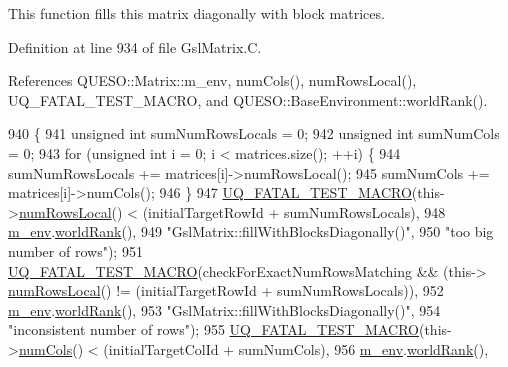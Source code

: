 This function fills {\ttfamily this} matrix diagonally with block matrices. 



Definition at line 934 of file Gsl\-Matrix.\-C.



References Q\-U\-E\-S\-O\-::\-Matrix\-::m\-\_\-env, num\-Cols(), num\-Rows\-Local(), U\-Q\-\_\-\-F\-A\-T\-A\-L\-\_\-\-T\-E\-S\-T\-\_\-\-M\-A\-C\-R\-O, and Q\-U\-E\-S\-O\-::\-Base\-Environment\-::world\-Rank().


\begin{DoxyCode}
940 \{
941   \textcolor{keywordtype}{unsigned} \textcolor{keywordtype}{int} sumNumRowsLocals = 0;
942   \textcolor{keywordtype}{unsigned} \textcolor{keywordtype}{int} sumNumCols       = 0;
943   \textcolor{keywordflow}{for} (\textcolor{keywordtype}{unsigned} \textcolor{keywordtype}{int} i = 0; i < matrices.size(); ++i) \{
944     sumNumRowsLocals += matrices[i]->numRowsLocal();
945     sumNumCols       += matrices[i]->numCols();
946   \}
947   \hyperlink{_defines_8h_a56d63d18d0a6d45757de47fcc06f574d}{UQ\_FATAL\_TEST\_MACRO}(this->\hyperlink{class_q_u_e_s_o_1_1_gsl_matrix_ab5ec937a9fd439eef1a87e12c0dbccb4}{numRowsLocal}() < (initialTargetRowId + 
      sumNumRowsLocals),
948                       \hyperlink{class_q_u_e_s_o_1_1_matrix_a247fb0fc0b87fecdee054bb4660b68e8}{m\_env}.\hyperlink{class_q_u_e_s_o_1_1_base_environment_a78b57112bbd0e6dd0e8afec00b40ffa7}{worldRank}(),
949                       \textcolor{stringliteral}{"GslMatrix::fillWithBlocksDiagonally()"},
950                       \textcolor{stringliteral}{"too big number of rows"});
951   \hyperlink{_defines_8h_a56d63d18d0a6d45757de47fcc06f574d}{UQ\_FATAL\_TEST\_MACRO}(checkForExactNumRowsMatching && (this->
      \hyperlink{class_q_u_e_s_o_1_1_gsl_matrix_ab5ec937a9fd439eef1a87e12c0dbccb4}{numRowsLocal}() != (initialTargetRowId + sumNumRowsLocals)),
952                       \hyperlink{class_q_u_e_s_o_1_1_matrix_a247fb0fc0b87fecdee054bb4660b68e8}{m\_env}.\hyperlink{class_q_u_e_s_o_1_1_base_environment_a78b57112bbd0e6dd0e8afec00b40ffa7}{worldRank}(),
953                       \textcolor{stringliteral}{"GslMatrix::fillWithBlocksDiagonally()"},
954                       \textcolor{stringliteral}{"inconsistent number of rows"});
955   \hyperlink{_defines_8h_a56d63d18d0a6d45757de47fcc06f574d}{UQ\_FATAL\_TEST\_MACRO}(this->\hyperlink{class_q_u_e_s_o_1_1_gsl_matrix_ad5005f168fe030468e834776afb1859b}{numCols}() < (initialTargetColId + sumNumCols),
956                       \hyperlink{class_q_u_e_s_o_1_1_matrix_a247fb0fc0b87fecdee054bb4660b68e8}{m\_env}.\hyperlink{class_q_u_e_s_o_1_1_base_environment_a78b57112bbd0e6dd0e8afec00b40ffa7}{worldRank}(),

\end{DoxyCode}
